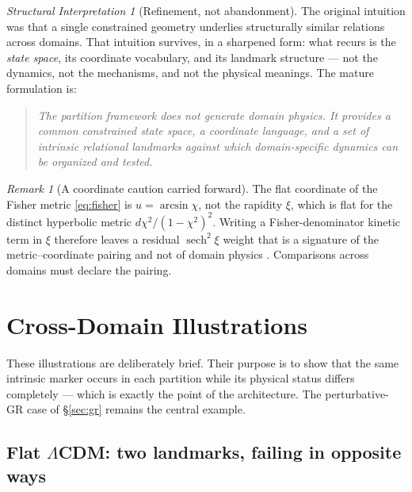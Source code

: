 \documentclass[11pt,a4paper]{article}
\theoremstyle{definition}
\theoremstyle{plain}
\theoremstyle{remark}
\newtheorem{remark}[definition]{Remark}
\newtheorem{interpretation}[definition]{Structural Interpretation}
\begin{document}
\begin{interpretation}[Refinement, not abandonment]
The original intuition was that a single constrained geometry underlies
structurally similar relations across domains. That intuition survives, in a
sharpened form: what recurs is the \emph{state space}, its coordinate
vocabulary, and its landmark structure --- not the dynamics, not the
mechanisms, and not the physical meanings. The mature formulation is:

\begin{quote}
\emph{The partition framework does not generate domain physics. It provides a
common constrained state space, a coordinate language, and a set of intrinsic
relational landmarks against which domain-specific dynamics can be organized
and tested.}
\end{quote}
\end{interpretation}

\begin{remark}[A coordinate caution carried forward]
The flat coordinate of the Fisher metric \eqref{eq:fisher} is $u=\arcsin\chi$,
not the rapidity $\xi$, which is flat for the distinct hyperbolic metric
$d\chi^{2}/(1-\chi^{2})^{2}$. Writing a Fisher-denominator kinetic term in $\xi$
therefore leaves a residual $\operatorname{sech}^{2}\xi$ weight that is a
signature of the metric--coordinate pairing and not of domain physics
\cite{EffPot}. Comparisons across domains must declare the pairing.
\end{remark}

\section{Cross-Domain Illustrations}
\label{sec:crossdomain}

These illustrations are deliberately brief. Their purpose is to show that the
same intrinsic marker occurs in each partition while its physical status
differs completely --- which is exactly the point of the architecture. The
perturbative-GR case of \S\ref{sec:gr} remains the central example.

\subsection{Flat $\Lambda$CDM: two landmarks, failing in opposite ways}
\label{sec:lcdm}
\end{document}

